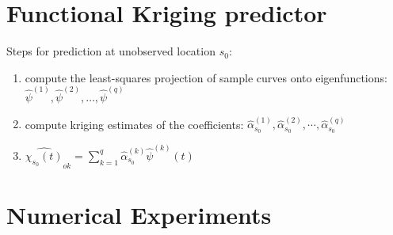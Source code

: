 	
%	
%	
%	
%		



\section{Functional Kriging predictor}


Steps for prediction at unobserved location $s_0$:
\begin{enumerate}
\item compute the least-squares projection of sample curves onto eigenfunctions: $\hat{\psi}^{(1)}, \hat{\psi}^{(2)}, \dots, \hat{\psi}^{(q)}$ 
\item compute kriging estimates of the coefficients: $\hat{\alpha}_{s_0}^{(1)}, \hat{\alpha}_{s_0}^{(2)}, \cdots, \hat{\alpha}_{s_0}^{(q)}$ 
\item $\widehat{\chi_{s_0}(t)}_{ok} = \sum_{k=1}^{q} \hat{\alpha}_{s_0}^{(k)}\hat{\psi}^{(k)}(t)$ %
\end{enumerate}



\section{Numerical Experiments}

